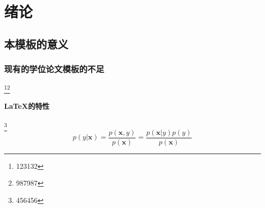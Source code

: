
\chapter{绪论}
\section{本模板的意义}
\subsection{现有的学位论文模板的不足}
\zhlipsum\footnote{123132}\footnote{987987}
\subsubsection{\LaTeX 的特性}
\zhlipsum\footnote{456456}
\begin{equation}
p(y|\boldsymbol{x}) = \frac{p(\boldsymbol{x},y)}{p(\boldsymbol{x})}=
\frac{p(\boldsymbol{x}|y)p(y)}{p(\boldsymbol{x})} 
\end{equation}